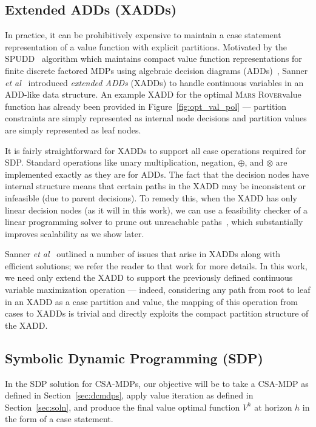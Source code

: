 \documentclass[letterpaper]{article}
\newcommand{\MarsRover}{\textsc{Mars Rover}}
\begin{document}
\subsection{Extended ADDs (XADDs)}

In practice, it can be prohibitively expensive to maintain a case
statement representation of a value function with explicit partitions.
Motivated by the SPUDD~\cite{spudd} algorithm which maintains compact
value function representations for finite discrete factored MDPs using
algebraic decision diagrams (ADDs)~\cite{bahar93add}, Sanner {\it et
al}~\cite{sanner_uai11} introduced \emph{extended ADDs} (XADDs) to handle
continuous variables in an ADD-like data structure.  An
example XADD for the optimal \MarsRover value function has already
been provided in Figure~\ref{fig:opt_val_pol} --- partition
constraints are simply represented as internal node decisions and
partition values are simply represented as leaf nodes.

It is fairly straightforward for XADDs to support all case operations
required for SDP.  Standard operations like unary multiplication,
negation, $\oplus$, and $\otimes$ are implemented exactly as they are
for ADDs.  The fact that the decision nodes have internal structure
means that certain paths in the XADD may be inconsistent or infeasible
(due to parent decisions).  To remedy this, when the XADD has only
linear decision nodes (as it will in this work), we can use a 
feasibility checker of a linear programming solver
to prune out unreachable paths~\cite{sanner_uai}, which substantially
improves scalability as we show later.

Sanner {\it et al}~\cite{sanner_uai11} outlined a number of issues
that arise in XADDs along with efficient solutions; we refer the
reader to that work for more details.  In this work, we need only
extend the XADD to support the previously defined continuous variable
maximization operation --- indeed, considering any path from root to
leaf in an XADD as a case partition and value, the mapping of this
operation from cases to XADDs is trivial and directly exploits
the compact partition structure of the XADD.

\subsection{Symbolic Dynamic Programming (SDP)}

In the SDP solution for CSA-MDPs, our objective will be to take
a CSA-MDP as defined in Section~\ref{sec:dcmdps}, apply value
iteration as defined in Section~\ref{sec:soln}, and produce
the final value optimal function $V^h$ at horizon $h$ in the form
of a case statement.
\end{document}
